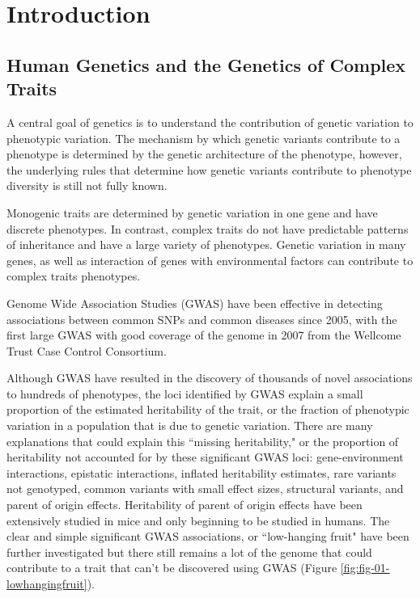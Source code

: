 
\chapter{Introduction}

\section{Human Genetics and the Genetics of Complex Traits}

A central goal of genetics is to understand the contribution of genetic variation to phenotypic variation. The mechanism by which genetic variants contribute to a phenotype is determined by the genetic architecture of the phenotype, however, the underlying rules that determine how genetic variants contribute to phenotype diversity is still not fully known. 

Monogenic traits are determined by genetic variation in one gene and have discrete phenotypes. In contrast, complex traits do not have predictable patterns of inheritance and have a large variety of phenotypes. Genetic variation in many genes, as well as interaction of genes with environmental factors can contribute to complex traits phenotypes. 

Genome Wide Association Studies (GWAS) have been effective in detecting associations between common SNPs and common diseases since 2005, with the first large GWAS with good coverage of the genome in 2007 from the Wellcome Trust Case Control Consortium\cite{WellcomeTrustCaseControlConsortium:2007do}. 

Although GWAS have resulted in the discovery of thousands of novel associations to hundreds of phenotypes, the loci identified by GWAS explain a small proportion of the estimated heritability of the trait, or the fraction of phenotypic variation in a population that is due to genetic variation. There are many explanations that could explain this ``missing heritability," or the proportion of heritability not accounted for by these significant GWAS loci: gene-environment interactions, epistatic interactions, inflated heritability estimates, rare variants not genotyped, common variants with small effect sizes, structural variants, and parent of origin effects\cite{Zaitlen2013,Eichler:2010kd,Gibson:2012kc,Zuk:cc}. Heritability of parent of origin effects have been extensively studied in mice \cite{Babak2008,Mott2014,Babak2015,Babak2012} and only beginning to be studied in humans\cite{Laurin:2017jv}. The clear and simple significant GWAS associations, or ``low-hanging fruit" have been further investigated but there still remains a lot of the genome that could contribute to a trait that can't be discovered using GWAS (Figure \ref{fig:fig-01-lowhangingfruit}).

